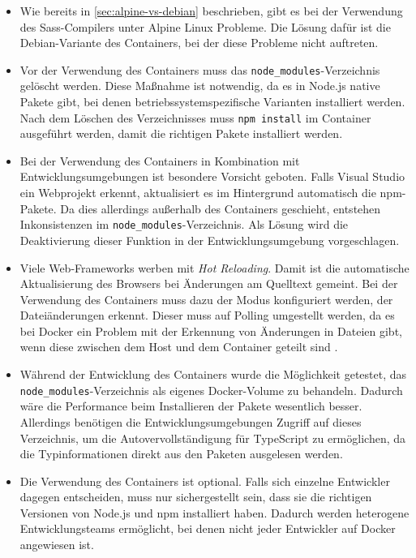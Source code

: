 \begin{itemize}
    \item Wie bereits in \cref{sec:alpine-vs-debian} beschrieben, gibt es bei der Verwendung des Sass-Compilers unter Alpine Linux Probleme.
        Die Lösung dafür ist die Debian-Variante des Containers, bei der diese Probleme nicht auftreten.
    \item Vor der Verwendung des Containers muss das \verb|node_modules|-Verzeichnis gelöscht werden.
        Diese Maßnahme ist notwendig, da es in Node.js native Pakete gibt, bei denen betriebssystemspezifische Varianten installiert werden.
        Nach dem Löschen des Verzeichnisses muss \verb|npm install| im Container ausgeführt werden, damit die richtigen Pakete installiert werden.
    \item Bei der Verwendung des Containers in Kombination mit Entwicklungsumgebungen ist besondere Vorsicht geboten.
        Falls \zB Visual Studio ein Webprojekt erkennt, aktualisiert es im Hintergrund automatisch die npm-Pakete.
        Da dies allerdings außerhalb des Containers geschieht, entstehen Inkonsistenzen im \verb|node_modules|-Verzeichnis.
        Als Lösung wird die Deaktivierung dieser Funktion in der Entwicklungsumgebung vorgeschlagen.
    \item Viele Web-Frameworks werben mit \emph{Hot Reloading}.
        Damit ist die automatische Aktualisierung des Browsers bei Änderungen am Quelltext gemeint.
        Bei der Verwendung des Containers muss dazu der Modus konfiguriert werden, der Dateiänderungen erkennt.
        Dieser muss auf Polling umgestellt werden, da es bei Docker ein Problem mit der Erkennung von Änderungen in Dateien gibt, wenn diese zwischen dem Host und dem Container geteilt sind \autocite{Docker.inotify-problem:online}. 
    \item Während der Entwicklung des Containers wurde die Möglichkeit getestet, das \verb|node_modules|-Verzeichnis als eigenes Docker-Volume zu behandeln.
        Dadurch wäre die Performance beim Installieren der Pakete wesentlich besser.
        Allerdings benötigen die Entwicklungsumgebungen Zugriff auf dieses Verzeichnis, um die Autovervollständigung für TypeScript zu ermöglichen, da die Typinformationen direkt aus den Paketen ausgelesen werden.
    \item Die Verwendung des Containers ist optional.
        Falls sich einzelne Entwickler dagegen entscheiden, muss nur sichergestellt sein, dass sie die richtigen Versionen von Node.js und npm installiert haben.
        Dadurch werden heterogene Entwicklungsteams ermöglicht, bei denen nicht jeder Entwickler auf Docker angewiesen ist.
\end{itemize}
